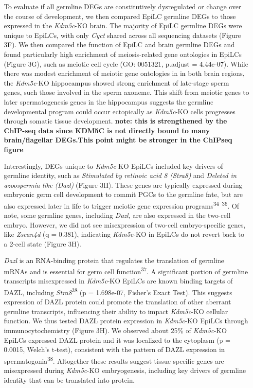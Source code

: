 \documentclass[
]{article}
\begin{document}
To evaluate if all germline DEGs are constitutively dysregulated or
change over the course of development, we then compared EpiLC germline
DEGs to those expressed in the \emph{Kdm5c}-KO brain. The majority of
EpiLC germline DEGs were unique to EpiLCs, with only \emph{Cyct} shared
across all sequencing datasets (Figure 3F). We then compared the
function of EpiLC and brain germline DEGs and found particularly high
enrichment of meiosis-related gene ontologies in EpiLCs (Figure 3G),
such as meiotic cell cycle (GO: 0051321, p.adjust = 4.44e-07). While
there was modest enrichment of meiotic gene ontologies in in both brain
regions, the \emph{Kdm5c}-KO hippocampus showed strong enrichment of
late-stage sperm genes, such those involved in the sperm axoneme. This
shift from meiotic genes to later spermatogenesis genes in the
hippocampus suggests the germline developmental program could occur
ectopically as \emph{Kdm5c}-KO cells progresses through somatic tissue
development. \textbf{note: this is strengthened by the ChIP-seq data
since KDM5C is not directly bound to many brain/flagellar DEGs.This
point might be stronger in the ChIPseq figure}

Interestingly, DEGs unique to \emph{Kdm5c}-KO EpiLCs included key
drivers of germline identity, such as \emph{Stimulated by retinoic acid
8 (Stra8)} and \emph{Deleted in azoospermia like (Dazl)} (Figure 3H).
These genes are typically expressed during embryonic germ cell
development to commit PGCs to the germline fate, but are also expressed
later in life to trigger meiotic gene expression
programs\textsuperscript{34--36}. Of note, some germline genes,
including \emph{Dazl}, are also expressed in the two-cell embryo.
However, we did not see misexpression of two-cell embryo-specific genes,
like \emph{Zscan4d} (q = 0.381), indicating \emph{Kdm5c}-KO in EpiLCs do
not revert back to a 2-cell state (Figure 3H).

\emph{Dazl} is an RNA-binding protein that regulates the translation of
germline mRNAs and is essential for germ cell
function\textsuperscript{37}. A significant portion of germline
transcripts misexpressed in \emph{Kdm5c}-KO EpiLCs are known binding
targets of DAZL, including \emph{Stra8}\textsuperscript{38} (p =
1.698e-07, Fisher's Exact Test). This suggests expression of DAZL
protein could promote the translation of other aberrant germline
transcripts, influencing their ability to impact \emph{Kdm5c}-KO
cellular function. We thus tested DAZL protein expression in
\emph{Kdm5c}-KO EpiLCs through immunocytochemistry (Figure 3H). We
observed about 25\% of \emph{Kdm5c}-KO EpiLCs expressed DAZL protein and
it was localized to the cytoplasm (p = 0.0015, Welch's t-test),
consistent with the pattern of DAZL expression in
spermatogonia\textsuperscript{38}. Altogether these results suggest
tissue-specific genes are misexpressed during \emph{Kdm5c}-KO
embryogenesis, including key drivers of germline identity that can be
translated into protein.
\end{document}
